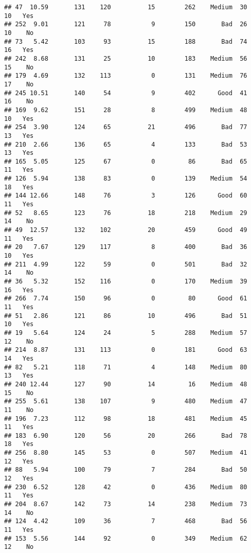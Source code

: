 \documentclass[
]{article}
\begin{document}
\begin{verbatim}
## 47  10.59       131    120          15        262    Medium  30        10   Yes
## 252  9.01       121     78           9        150       Bad  26        10    No
## 73   5.42       103     93          15        188       Bad  74        16   Yes
## 242  8.68       131     25          10        183    Medium  56        15    No
## 179  4.69       132    113           0        131    Medium  76        17    No
## 245 10.51       140     54           9        402      Good  41        16    No
## 169  9.62       151     28           8        499    Medium  48        10   Yes
## 254  3.90       124     65          21        496       Bad  77        13   Yes
## 210  2.66       136     65           4        133       Bad  53        13   Yes
## 165  5.05       125     67           0         86       Bad  65        11   Yes
## 126  5.94       138     83           0        139    Medium  54        18   Yes
## 144 12.66       148     76           3        126      Good  60        11   Yes
## 52   8.65       123     76          18        218    Medium  29        14    No
## 49  12.57       132    102          20        459      Good  49        11   Yes
## 20   7.67       129    117           8        400       Bad  36        10   Yes
## 211  4.99       122     59           0        501       Bad  32        14    No
## 36   5.32       152    116           0        170    Medium  39        16   Yes
## 266  7.74       150     96           0         80      Good  61        11   Yes
## 51   2.86       121     86          10        496       Bad  51        10   Yes
## 19   5.64       124     24           5        288    Medium  57        12    No
## 214  8.87       131    113           0        181      Good  63        14   Yes
## 82   5.21       118     71           4        148    Medium  80        13   Yes
## 240 12.44       127     90          14         16    Medium  48        15    No
## 255  5.61       138    107           9        480    Medium  47        11    No
## 196  7.23       112     98          18        481    Medium  45        11   Yes
## 183  6.90       120     56          20        266       Bad  78        18   Yes
## 256  8.80       145     53           0        507    Medium  41        12   Yes
## 88   5.94       100     79           7        284       Bad  50        12   Yes
## 230  6.52       128     42           0        436    Medium  80        11   Yes
## 204  8.67       142     73          14        238    Medium  73        14    No
## 124  4.42       109     36           7        468       Bad  56        11   Yes
## 153  5.56       144     92           0        349    Medium  62        12    No

\end{verbatim}
\end{document}

